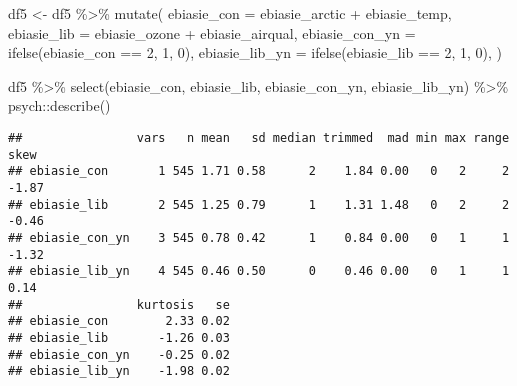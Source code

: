 \documentclass[
]{article}
\newenvironment{Shaded}{\begin{snugshade}}{\end{snugshade}}
\newcommand{\AttributeTok}[1]{\textcolor[rgb]{0.77,0.63,0.00}{#1}}
\newcommand{\DecValTok}[1]{\textcolor[rgb]{0.00,0.00,0.81}{#1}}
\newcommand{\FunctionTok}[1]{\textcolor[rgb]{0.00,0.00,0.00}{#1}}
\newcommand{\NormalTok}[1]{#1}
\newcommand{\OtherTok}[1]{\textcolor[rgb]{0.56,0.35,0.01}{#1}}
\newcommand{\SpecialCharTok}[1]{\textcolor[rgb]{0.00,0.00,0.00}{#1}}
\begin{document}
\begin{Shaded}
\begin{Highlighting}[]
\NormalTok{df5 }\OtherTok{\textless{}{-}}\NormalTok{ df5 }\SpecialCharTok{\%\textgreater{}\%} 
  \FunctionTok{mutate}\NormalTok{(}
    \AttributeTok{ebiasie\_con =}\NormalTok{ ebiasie\_arctic }\SpecialCharTok{+}\NormalTok{ ebiasie\_temp,}
    \AttributeTok{ebiasie\_lib =}\NormalTok{ ebiasie\_ozone }\SpecialCharTok{+}\NormalTok{ ebiasie\_airqual,}
    \AttributeTok{ebiasie\_con\_yn =} \FunctionTok{ifelse}\NormalTok{(ebiasie\_con }\SpecialCharTok{==} \DecValTok{2}\NormalTok{, }\DecValTok{1}\NormalTok{, }\DecValTok{0}\NormalTok{),}
    \AttributeTok{ebiasie\_lib\_yn =} \FunctionTok{ifelse}\NormalTok{(ebiasie\_lib }\SpecialCharTok{==} \DecValTok{2}\NormalTok{, }\DecValTok{1}\NormalTok{, }\DecValTok{0}\NormalTok{),}
\NormalTok{  )}

\NormalTok{df5 }\SpecialCharTok{\%\textgreater{}\%} 
  \FunctionTok{select}\NormalTok{(ebiasie\_con, ebiasie\_lib, ebiasie\_con\_yn, ebiasie\_lib\_yn) }\SpecialCharTok{\%\textgreater{}\%} 
\NormalTok{  psych}\SpecialCharTok{::}\FunctionTok{describe}\NormalTok{()}
\end{Highlighting}
\end{Shaded}

\begin{verbatim}
##                vars   n mean   sd median trimmed  mad min max range  skew
## ebiasie_con       1 545 1.71 0.58      2    1.84 0.00   0   2     2 -1.87
## ebiasie_lib       2 545 1.25 0.79      1    1.31 1.48   0   2     2 -0.46
## ebiasie_con_yn    3 545 0.78 0.42      1    0.84 0.00   0   1     1 -1.32
## ebiasie_lib_yn    4 545 0.46 0.50      0    0.46 0.00   0   1     1  0.14
##                kurtosis   se
## ebiasie_con        2.33 0.02
## ebiasie_lib       -1.26 0.03
## ebiasie_con_yn    -0.25 0.02
## ebiasie_lib_yn    -1.98 0.02
\end{verbatim}
\end{document}
